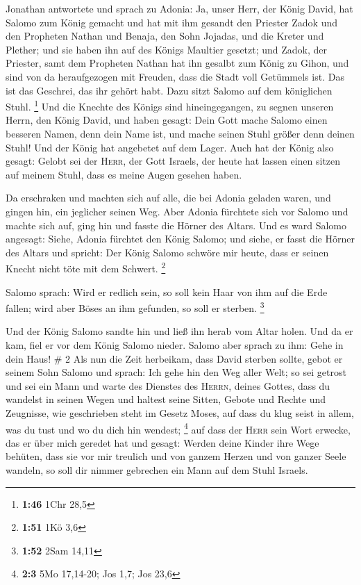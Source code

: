  Jonathan antwortete und sprach zu Adonia: Ja, unser
Herr, der König David, hat Salomo zum König gemacht  und
hat mit ihm gesandt den Priester Zadok und den Propheten Nathan und
Benaja, den Sohn Jojadas, und die Kreter und Plether; und sie haben ihn
auf des Königs Maultier gesetzt;  und Zadok, der
Priester, samt dem Propheten Nathan hat ihn gesalbt zum König zu Gihon,
und sind von da heraufgezogen mit Freuden, dass die Stadt voll Getümmels
ist. Das ist das Geschrei, das ihr gehört habt.  Dazu
sitzt Salomo auf dem königlichen Stuhl. \footnote{\textbf{1:46} 1Chr
  28,5}  Und die Knechte des Königs sind hineingegangen,
zu segnen unseren Herrn, den König David, und haben gesagt: Dein Gott
mache Salomo einen besseren Namen, denn dein Name ist, und mache seinen
Stuhl größer denn deinen Stuhl! Und der König hat angebetet auf dem
Lager.  Auch hat der König also gesagt: Gelobt sei der
\textsc{Herr}, der Gott Israels, der heute hat lassen einen sitzen auf
meinem Stuhl, dass es meine Augen gesehen haben.

 Da erschraken und machten sich auf alle, die bei Adonia
geladen waren, und gingen hin, ein jeglicher seinen Weg. 
Aber Adonia fürchtete sich vor Salomo und machte sich auf, ging hin und
fasste die Hörner des Altars.  Und es ward Salomo
angesagt: Siehe, Adonia fürchtet den König Salomo; und siehe, er fasst
die Hörner des Altars und spricht: Der König Salomo schwöre mir heute,
dass er seinen Knecht nicht töte mit dem Schwert. \footnote{\textbf{1:51}
  1Kö 3,6}

 Salomo sprach: Wird er redlich sein, so soll kein Haar
von ihm auf die Erde fallen; wird aber Böses an ihm gefunden, so soll er
sterben. \footnote{\textbf{1:52} 2Sam 14,11}

 Und der König Salomo sandte hin und ließ ihn herab vom
Altar holen. Und da er kam, fiel er vor dem König Salomo nieder. Salomo
aber sprach zu ihm: Gehe in dein Haus! \# 2  Als nun die
Zeit herbeikam, dass David sterben sollte, gebot er seinem Sohn Salomo
und sprach:  Ich gehe hin den Weg aller Welt; so sei
getrost und sei ein Mann  und warte des Dienstes des
\textsc{Herrn}, deines Gottes, dass du wandelst in seinen Wegen und
haltest seine Sitten, Gebote und Rechte und Zeugnisse, wie geschrieben
steht im Gesetz Moses, auf dass du klug seist in allem, was du tust und
wo du dich hin wendest; \footnote{\textbf{2:3} 5Mo 17,14-20; Jos 1,7;
  Jos 23,6}  auf dass der \textsc{Herr} sein Wort erwecke,
das er über mich geredet hat und gesagt: Werden deine Kinder ihre Wege
behüten, dass sie vor mir treulich und von ganzem Herzen und von ganzer
Seele wandeln, so soll dir nimmer gebrechen ein Mann auf dem Stuhl
Israels.

